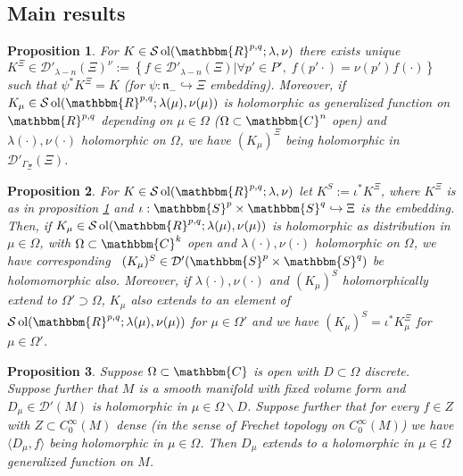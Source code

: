 \documentclass{article}
\newcommand{\assign}{:=}
\newcommand{\comma}{{,}}
\newcommand{\tmop}[1]{\ensuremath{\operatorname{#1}}}
\numberwithin{definition}{section}
\numberwithin{lemma}{section}
\newtheorem{proposition}{Proposition}
\numberwithin{proposition}{section}
{\theorembodyfont{\rmfamily}\newtheorem{remark}{Remark}
\numberwithin{remark}{section}
}
\begin{document}
\subsection{Main results}

\begin{proposition}
  \label{k-finite:prop-claim2}For $K \in \mathcal{S} \tmop{ol} (
  \mathbbm{R}^{p, q} ; \lambda, \nu)$ there exists unique $K^{\Xi} \in
  \mathcal{D}'_{\lambda - n} ( \Xi)^{\nu} \assign \left\{ f \in
  \mathcal{D}'_{\lambda - n} ( \Xi) | \forall p' \in P', \; f ( p' \cdot) =
  \nu ( p')^{} f ( \cdot) \right\}$ such that $\psi^{\ast} K^{\Xi} = K$ (for
  $\psi : \mathfrak{n}_- \hookrightarrow \Xi$ embedding). Moreover, if
  $K_{\mu} \in \mathcal{S} \tmop{ol} ( \mathbbm{R}^{p, q} ; \lambda ( \mu),
  \nu ( \mu))$ is holomorphic as generalized function on $\mathbbm{R}^{p, q}$
  depending on $\mu \in \Omega$ ($\Omega \subset \mathbbm{C}^n$ open) and
  $\lambda ( \cdot), \nu ( \cdot)$ holomorphic on $\Omega$, we have $(
  K_{\mu})^{\Xi}$ being holomorphic in $\mathcal{D}'_{\Gamma_{\Xi}} ( \Xi)$. 
\end{proposition}

\begin{proposition}
  \label{k-finite:prop-holo-to-holo}For $K \in \mathcal{S} \tmop{ol} (
  \mathbbm{R}^{p, q} ; \lambda, \nu)$ let $K^S \assign \iota^{\ast} K^{\Xi}$,
  where $K^{\Xi}$ is as in proposition \ref{k-finite:prop-claim2} and $\iota :
  \mathbbm{S}^p \times \mathbbm{S}^q \hookrightarrow \Xi$ is the embedding.
  Then, if $K_{\mu} \in \mathcal{S} \tmop{ol} ( \mathbbm{R}^{p, q} ; \lambda (
  \mu), \nu ( \mu))$ is holomorphic as distribution in $\mu \in \Omega$, with
  $\Omega \subset \mathbbm{C}^k$ open and $\lambda ( \cdot) \comma \nu (
  \cdot)$ holomorphic on $\Omega$, we have corresponding \ $( K_{\mu})^S \in
  \mathcal{D}' ( \mathbbm{S}^p \times \mathbbm{S}^q)$ be holomomorphic also.
  Moreover, if $\lambda ( \cdot), \nu ( \cdot)$ and $( K_{\mu})^S$
  holomorphically extend to $\Omega' \supset \Omega$, $K_{\mu}$ also extends
  to an element of $\mathcal{S} \tmop{ol} ( \mathbbm{R}^{p, q} ; \lambda (
  \mu), \nu ( \mu))$ for $\mu \in \Omega'$ and we have $( K_{\mu})^S =
  \iota^{\ast} K_{\mu}^{\Xi}$ for $\mu \in \Omega'$.
\end{proposition}

\begin{proposition}
  \label{k-finite:prop-kfinite-extension-oneparam}Suppose $\Omega \subset
  \mathbbm{C}$ is open with $D \subset \Omega$ discrete. Suppose further that
  $M$ is a smooth manifold with fixed volume form and $D_{\mu} \in
  \mathcal{D}' ( M)$ is holomorphic in $\mu \in \Omega \backslash D$. Suppose
  further that for every $f \in Z$ with $Z \subset C^{\infty}_0 ( M)$ dense
  (in the sense of Frechet topology on $C_0^{\infty} ( M)$) we have $\langle
  D_{\mu}, f \rangle$ being holomorphic in $\mu \in \Omega$. Then $D_{\mu}$
  extends to a holomorphic in $\mu \in \Omega$ generalized function on $M$. 
\end{proposition}
\end{document}
